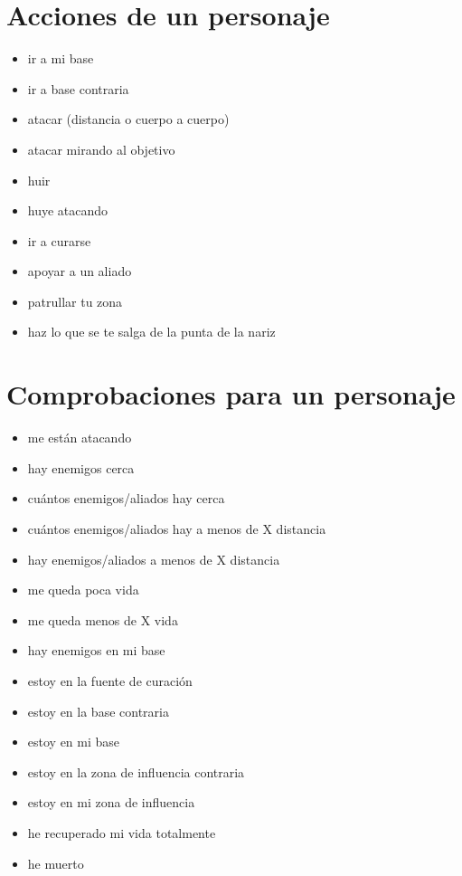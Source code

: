 \documentclass[a4paper,10pt]{article}
\begin{document}
\section{Acciones de un personaje}
\begin{itemize}
 \item ir a mi base
 \item ir a base contraria
 \item atacar (distancia o cuerpo a cuerpo)
 \item atacar mirando al objetivo
 \item huir
 \item huye atacando
 \item ir a curarse
 \item apoyar a un aliado
 \item patrullar tu zona
 \item haz lo que se te salga de la punta de la nariz
\end{itemize}


\section{Comprobaciones para un personaje}
\begin{itemize}
 \item me están atacando
 \item hay enemigos cerca
 \item cuántos enemigos/aliados hay cerca
 \item cuántos enemigos/aliados hay a menos de X distancia
 \item hay enemigos/aliados a menos de X distancia
 \item me queda poca vida
 \item me queda menos de X vida
 \item hay enemigos en mi base
 \item estoy en la fuente de curación
 \item estoy en la base contraria
 \item estoy en mi base
 \item estoy en la zona de influencia contraria
 \item estoy en mi zona de influencia
 \item he recuperado mi vida totalmente
 \item he muerto
\end{itemize}
\end{document}
